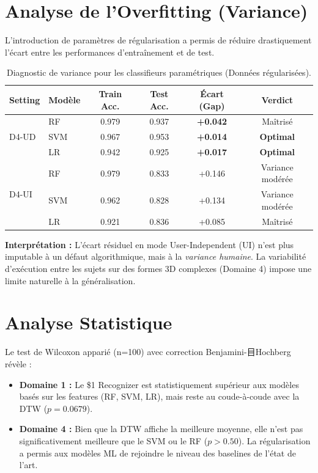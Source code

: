 \documentclass[a4paper,11pt]{article}
\begin{document}
\section{Analyse de l'Overfitting (Variance)}

L'introduction de paramètres de régularisation a permis de réduire drastiquement l'écart entre les performances d'entraînement et de test.

\begin{table}[H]
\centering
\caption{Diagnostic de variance pour les classifieurs paramétriques (Données régularisées).}
\label{tab:overfitting}
\begin{tabular}{llcccc}
\toprule
\textbf{Setting} & \textbf{Modèle} & \textbf{Train Acc.} & \textbf{Test Acc.} & \textbf{Écart (Gap)} & \textbf{Verdict} \\ 
\midrule
\multirow{3}{*}{D4-UD} 
 & RF & 0.979 & 0.937 & \textbf{+0.042} & Maîtrisé \\
 & SVM & 0.967 & 0.953 & \textbf{+0.014} & \textbf{Optimal} \\
 & LR & 0.942 & 0.925 & \textbf{+0.017} & \textbf{Optimal} \\
\midrule
\multirow{3}{*}{D4-UI} 
 & RF & 0.979 & 0.833 & +0.146 & Variance modérée \\
 & SVM & 0.962 & 0.828 & +0.134 & Variance modérée \\
 & LR & 0.921 & 0.836 & +0.085 & Maîtrisé \\
\bottomrule
\end{tabular}
\end{table}

\textbf{Interprétation :} L'écart résiduel en mode User-Independent (UI) n'est plus imputable à un défaut algorithmique, mais à la \textit{variance humaine}. La variabilité d'exécution entre les sujets sur des formes 3D complexes (Domaine 4) impose une limite naturelle à la généralisation.

\section{Analyse Statistique}
Le test de Wilcoxon apparié (n=100) avec correction Benjamini-目Hochberg révèle :
\begin{itemize}
    \item \textbf{Domaine 1 :} Le \$1 Recognizer est statistiquement supérieur aux modèles basés sur les features (RF, SVM, LR), mais reste au coude-à-coude avec la DTW ($p=0.0679$).
    \item \textbf{Domaine 4 :} Bien que la DTW affiche la meilleure moyenne, elle n'est pas significativement meilleure que le SVM ou le RF ($p > 0.50$). La régularisation a permis aux modèles ML de rejoindre le niveau des baselines de l'état de l'art.
\end{itemize}
\end{document}

